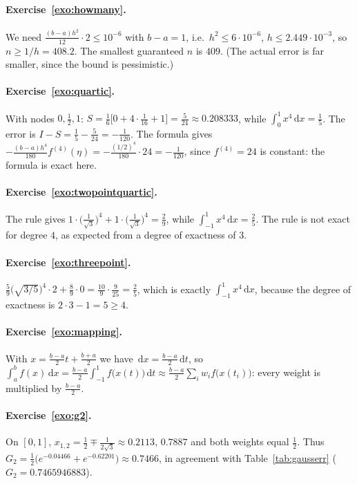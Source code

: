 \documentclass[11pt,a4paper,twoside,openright]{book}
\newcommand{\dd}{\,\mathrm{d}}
\newcounter{exo}[chapter]
\begin{document}
\paragraph{Exercise~\ref{exo:howmany}.}
We need $\frac{(b-a)h^{2}}{12}\cdot2\le10^{-6}$ with $b-a=1$, i.e.\ $h^{2}\le6\cdot10^{-6}$, $h\le2.449\cdot10^{-3}$, so $n\ge1/h=408.2$. The smallest guaranteed $n$ is $409$. (The actual error is far smaller, since the bound is pessimistic.)

\paragraph{Exercise~\ref{exo:quartic}.}
With nodes $0,\frac12,1$: $S=\frac16\bigl[0+4\cdot\frac1{16}+1\bigr]=\frac{5}{24}\approx0.208333$, while $\int_0^1x^{4}\dd x=\frac15$. The error is $I-S=\frac15-\frac5{24}=-\frac1{120}$. The formula gives $-\frac{(b-a)h^{4}}{180}f^{(4)}(\eta)=-\frac{(1/2)^{4}}{180}\cdot24=-\frac1{120}$, since $f^{(4)}=24$ is constant: the formula is exact here.

\paragraph{Exercise~\ref{exo:twopointquartic}.}
The rule gives $1\cdot\bigl(\frac1{\sqrt3}\bigr)^{4}+1\cdot\bigl(\frac1{\sqrt3}\bigr)^{4}=\frac29$, while $\int_{-1}^{1}x^{4}\dd x=\frac25$. The rule is not exact for degree $4$, as expected from a degree of exactness of $3$.

\paragraph{Exercise~\ref{exo:threepoint}.}
$\frac59\bigl(\sqrt{3/5}\bigr)^{4}\cdot2+\frac89\cdot0=\frac{10}{9}\cdot\frac{9}{25}=\frac25$, which is exactly $\int_{-1}^{1}x^{4}\dd x$, because the degree of exactness is $2\cdot3-1=5\ge4$.

\paragraph{Exercise~\ref{exo:mapping}.}
With $x=\frac{b-a}{2}t+\frac{b+a}{2}$ we have $\dd x=\frac{b-a}{2}\dd t$, so $\int_a^bf(x)\dd x=\frac{b-a}{2}\int_{-1}^{1}f\bigl(x(t)\bigr)\dd t\approx\frac{b-a}{2}\sum_iw_if\bigl(x(t_i)\bigr)$: every weight is multiplied by $\frac{b-a}{2}$.

\paragraph{Exercise~\ref{exo:g2}.}
On $[0,1]$, $x_{1,2}=\frac12\mp\frac{1}{2\sqrt3}\approx0.2113,\,0.7887$ and both weights equal $\frac12$. Thus $G_2=\frac12\bigl(e^{-0.04466}+e^{-0.62201}\bigr)\approx0.7466$, in agreement with Table~\ref{tab:gausserr} ($G_2=0.7465946883$).
\end{document}
